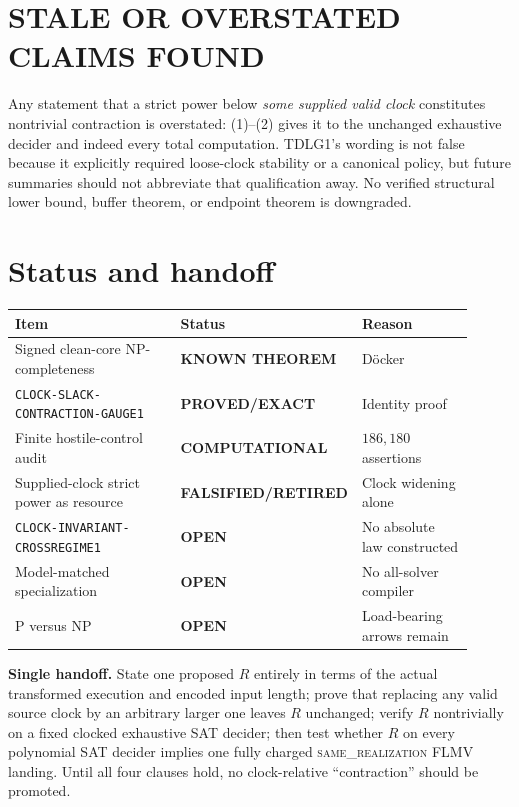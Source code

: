 \documentclass[11pt]{article}
\newcommand{\EXACT}{\textbf{PROVED/EXACT}}
\newcommand{\KNOWN}{\textbf{KNOWN THEOREM}}
\newcommand{\COMP}{\textbf{COMPUTATIONAL}}
\newcommand{\OPEN}{\textbf{OPEN}}
\newcommand{\RETIRED}{\textbf{FALSIFIED/RETIRED}}
\newcommand{\same}{\textsc{same\_realization}}
\begin{document}
\section{STALE OR OVERSTATED CLAIMS FOUND}

Any statement that a strict power below \emph{some supplied valid clock}
constitutes nontrivial contraction is overstated: (1)--(2) gives it to the
unchanged exhaustive decider and indeed every total computation.  TDLG1's
wording is not false because it explicitly required loose-clock stability or
a canonical policy, but future summaries should not abbreviate that
qualification away.  No verified structural lower bound, buffer theorem, or
endpoint theorem is downgraded.

\section{Status and handoff}

\begin{center}
\begin{tabular}{p{0.45\linewidth}p{0.18\linewidth}p{0.28\linewidth}}
\toprule Item & Status & Reason\\ \midrule
Signed clean-core NP-completeness & \KNOWN & D\"ocker\\
\texttt{CLOCK-SLACK-CONTRACTION-GAUGE1} & \EXACT & Identity proof\\
Finite hostile-control audit & \COMP & $186{,}180$ assertions\\
Supplied-clock strict power as resource & \RETIRED & Clock widening alone\\
\texttt{CLOCK-INVARIANT-CROSSREGIME1} & \OPEN & No absolute law constructed\\
Model-matched specialization & \OPEN & No all-solver compiler\\
P versus NP & \OPEN & Load-bearing arrows remain\\
\bottomrule
\end{tabular}
\end{center}

\textbf{Single handoff.}  State one proposed $R$ entirely in terms of the
actual transformed execution and encoded input length; prove that replacing
any valid source clock by an arbitrary larger one leaves $R$ unchanged;
verify $R$ nontrivially on a fixed clocked exhaustive SAT decider; then test
whether $R$ on every polynomial SAT decider implies one fully charged
\same{} FLMV landing.  Until all four clauses hold, no clock-relative
``contraction'' should be promoted.
\end{document}
